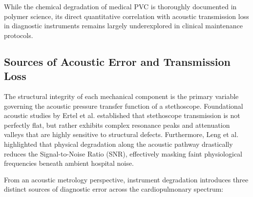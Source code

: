 While the chemical degradation of medical PVC is thoroughly documented in polymer science, its direct quantitative correlation with acoustic transmission loss in diagnostic instruments remains largely underexplored in clinical maintenance protocols.

\subsection{Sources of Acoustic Error and Transmission Loss}

The structural integrity of each mechanical component is the primary variable governing the acoustic pressure transfer function of a stethoscope. Foundational acoustic studies by Ertel et al. \cite{ertel1966stethoscope} established that stethoscope transmission is not perfectly flat, but rather exhibits complex resonance peaks and attenuation valleys that are highly sensitive to structural defects. Furthermore, Leng et al. \cite{leng2015electronic} highlighted that physical degradation along the acoustic pathway drastically reduces the Signal-to-Noise Ratio (SNR), effectively masking faint physiological frequencies beneath ambient hospital noise.

From an acoustic metrology perspective, instrument degradation introduces three distinct sources of diagnostic error across the cardiopulmonary spectrum:

